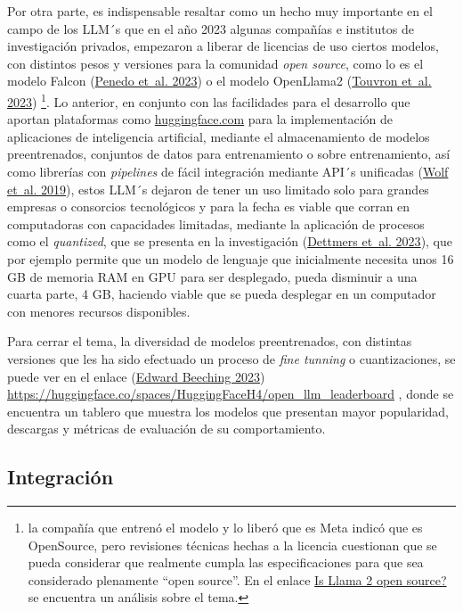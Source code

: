 \documentclass[
  12pt,
  openany]{book}
\begin{document}
Por otra parte, es indispensable resaltar como un hecho muy importante en el campo de los LLM´s que en el año 2023 algunas compañías e institutos de investigación privados, empezaron a liberar de licencias de uso ciertos modelos, con distintos pesos y versiones para la comunidad \emph{open source}, como lo es el modelo Falcon (\protect\hyperlink{ref-penedo2023}{Penedo et~al. 2023}) o el modelo OpenLlama2 (\protect\hyperlink{ref-touvron2023}{Touvron et~al. 2023}) \footnote{la compañía que entrenó el modelo y lo liberó que es Meta indicó que es OpenSource, pero revisiones técnicas hechas a la licencia cuestionan que se pueda considerar que realmente cumpla las especificaciones para que sea considerado plenamente ``open source''. En el enlace \href{https://opensourceconnections.com/blog/2023/07/19/is-llama-2-open-source-no-and-perhaps-we-need-a-new-definition-of-open/}{Is Llama 2 open source?} se encuentra un análisis sobre el tema.}. Lo anterior, en conjunto con las facilidades para el desarrollo que aportan plataformas como \url{huggingface.com} para la implementación de aplicaciones de inteligencia artificial, mediante el almacenamiento de modelos preentrenados, conjuntos de datos para entrenamiento o sobre entrenamiento, así como librerías con \emph{pipelines} de fácil integración mediante API´s unificadas (\protect\hyperlink{ref-wolf2019}{Wolf et~al. 2019}), estos LLM´s dejaron de tener un uso limitado solo para grandes empresas o consorcios tecnológicos y para la fecha es viable que corran en computadoras con capacidades limitadas, mediante la aplicación de procesos como el \emph{quantized}, que se presenta en la investigación (\protect\hyperlink{ref-dettmers2023}{Dettmers et~al. 2023}), que por ejemplo permite que un modelo de lenguaje que inicialmente necesita unos 16 GB de memoria RAM en GPU para ser desplegado, pueda disminuir a una cuarta parte, 4 GB, haciendo viable que se pueda desplegar en un computador con menores recursos disponibles.

Para cerrar el tema, la diversidad de modelos preentrenados, con distintas versiones que les ha sido efectuado un proceso de \emph{fine tunning} o cuantizaciones, se puede ver en el enlace (\protect\hyperlink{ref-openllm}{Edward Beeching 2023}) \url{https://huggingface.co/spaces/HuggingFaceH4/open_llm_leaderboard} , donde se encuentra un tablero que muestra los modelos que presentan mayor popularidad, descargas y métricas de evaluación de su comportamiento.

\hypertarget{int}{%
\subsection{Integración}\label{int}}
\end{document}
